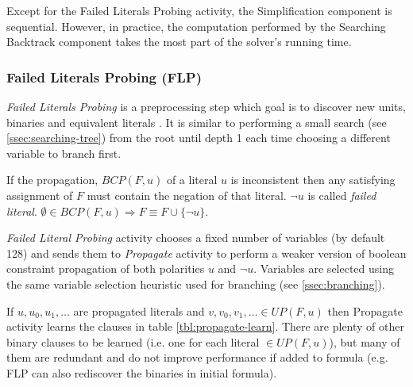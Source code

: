 Except for the Failed Literals Probing activity, the Simplification
component is sequential. However, in practice, the computation
performed by the Searching Backtrack component takes the most part
of the solver's running time.


\subsubsection{Failed Literals Probing (FLP)}
\label{sssec:flp}

\emph{Failed Literals Probing} is a preprocessing step which
goal is to discover new units, binaries and equivalent literals
\cite{Lynce03probing-basedpreprocessing}.  It is similar to
performing a small search (see \ref{ssec:searching-tree}) from
the root until depth 1 each time choosing a different variable to
branch first.

\begin{myprop}
  If the propagation, $BCP(F, u)$ of a literal $u$ is inconsistent
  then any satisfying assignment of $F$ must contain the negation
  of that literal. $\neg u$ is called \emph{failed literal}.
  $\emptyset \in BCP(F, u) \Rightarrow F \equiv F \cup \{\neg u\}$.
\end{myprop}


\emph{Failed Literal Probing} activity chooses a fixed number of
variables (by default 128) and sends them to \emph{Propagate}
activity to perform a weaker version of boolean constraint
propagation of both polarities $u$ and $\neg u$. Variables are
selected using the same variable selection heuristic used for
branching (see \ref{ssec:branching}).

If $u, u_0, u_1, \ldots$ are propagated literals and $v, v_0, v_1,
\ldots \in UP(F, u)$ then Propagate activity learns the clauses in
table \ref{tbl:propagate-learn}. There are plenty of other binary
clauses to be learned (i.e. one for each literal $\in UP(F, u)$),
but many of them are redundant and do not improve performance if
added to formula (e.g. FLP can also rediscover the binaries in
initial formula).

\begin{table}[h]
  \centering
  \caption{Learned units and binaries by Propagate activity}
  \label{tbl:propagate-learn}
\end{table}



